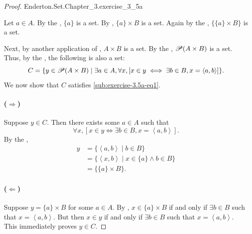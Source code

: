 \documentclass{report}
\begin{document}
\begin{proof}

    {Enderton.Set.Chapter\_3.exercise\_3\_5a}

  Let $a \in A$.
  By the , $\{a\}$ is a set.
  By , $\{a\} \times B$ is a set.
  Again by the , $\{\{a\} \times B\}$ is a set.

  Next, by another application of , $A \times B$
    is a set.
  By the , $\mathscr{P}(A \times B)$ is a set.
  Thus, by the , the following is also a set:
    $$C = \{ y \in \mathscr{P}(A \times B) \mid
      \exists a \in A, \forall x, \left[ x \in y \iff
        \exists b \in B, x = \left< a, b \right> \right] \}.$$
  We now show that $C$ satisfies \eqref{sub:exercise-3.5a-eq1}.

  \paragraph{($\Rightarrow$)}%

    Suppose $y \in C$.
    Then there exists some $a \in A$ such that
      $$\forall x, \left[ x \in y \iff
        \exists b \in B, x = \left< a, b \right> \right].$$
    By the ,
      \begin{align*}
        y
          & = \{ \left< a, b \right> \mid b \in B \} \\
          & = \{ \left< x, b \right> \mid x \in \{a\} \land b \in B \} \\
          & = \{ \{a\} \times B \}.
      \end{align*}

  \paragraph{($\Leftarrow$)}%

    Suppose $y = \{a\} \times B$ for some $a \in A$.
    By , $x \in \{a\} \times B$ if and only if
      $\exists b \in B$ such that $x = \left< a, b \right>$.
    But then $x \in y$ if and only if $\exists b \in B$ such that
      $x = \left< a, b \right>$.
    This immediately proves $y \in C$.

\end{proof}

\subsection{}%
\label{sub:exercise-3.5b}
\end{document}
